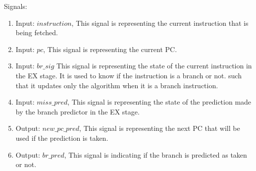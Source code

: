 Signals:
\begin{enumerate}[label={\textbullet}]
    \item Input: $instruction$, This signal is representing the current instruction that is being fetched.
    \item Input: $pc$, This signal is representing the current PC.
    \item Input: $br\_sig$ This signal is representing the state of the current instruction in the EX stage. It is used to know if the instruction is a branch or not.
    such that it updates only the algorithm when it is a branch instruction.
    \item Input: $miss\_pred$, This signal is representing the state of the prediction made by the branch predictor in the EX stage.
    \item Output: $new\_pc\_pred$, This signal is representing the next PC that will be used if the prediction is taken.
    \item Output: $br\_pred$, This signal is indicating if the branch is predicted as taken or not.
\end{enumerate}
